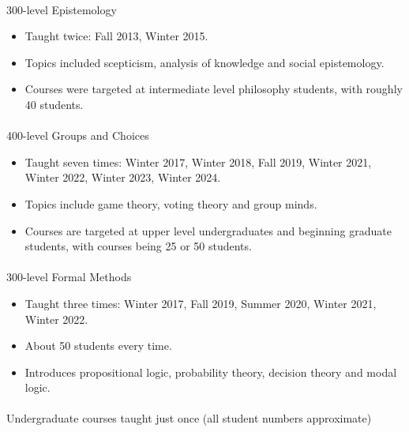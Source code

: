 \documentclass[
  10pt,
  letterpaper,
  DIV=11,
  numbers=noendperiod,
  twoside]{scrartcl}
\makeatletter
\let\oldparagraph\paragraph
\renewcommand{\paragraph}{
    \@ifstar
      \xxxParagraphStar
      \xxxParagraphNoStar
  }
\newcommand{\xxxParagraphStar}[1]{\oldparagraph*{#1}\mbox{}}
\newcommand{\xxxParagraphNoStar}[1]{\oldparagraph{#1}\mbox{}}
\providecommand{\tightlist}{%
  \setlength{\itemsep}{0pt}\setlength{\parskip}{0pt}}\usepackage{longtable,booktabs,array}
\makeatother
\begin{document}
\paragraph{300-level Epistemology}\label{level-epistemology}

\begin{itemize}
\tightlist
\item
  Taught twice: Fall 2013, Winter 2015.
\item
  Topics included scepticism, analysis of knowledge and social
  epistemology.
\item
  Courses were targeted at intermediate level philosophy students, with
  roughly 40 students.
\end{itemize}

\paragraph{400-level Groups and Choices}\label{level-groups-and-choices}

\begin{itemize}
\tightlist
\item
  Taught seven times: Winter 2017, Winter 2018, Fall 2019, Winter 2021,
  Winter 2022, Winter 2023, Winter 2024.
\item
  Topics include game theory, voting theory and group minds.
\item
  Courses are targeted at upper level undergraduates and beginning
  graduate students, with courses being 25 or 50 students.
\end{itemize}

\paragraph{300-level Formal Methods}\label{level-formal-methods}

\begin{itemize}
\tightlist
\item
  Taught three times: Winter 2017, Fall 2019, Summer 2020, Winter 2021,
  Winter 2022.
\item
  About 50 students every time.
\item
  Introduces propositional logic, probability theory, decision theory
  and modal logic.
\end{itemize}

\paragraph{Undergraduate courses taught just once (all student numbers
approximate)}\label{undergraduate-courses-taught-just-once-all-student-numbers-approximate}
\end{document}
